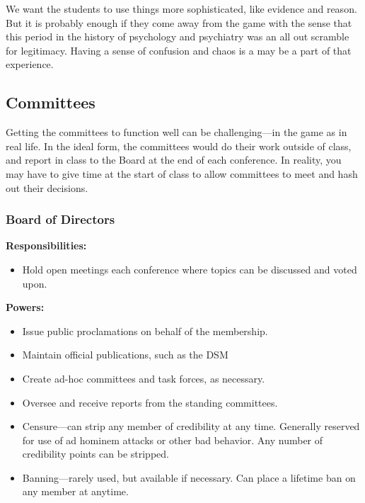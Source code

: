 \begin{refsection}
We want the students to use things more sophisticated, like evidence and reason. But it is probably enough if they come away from the game with the sense that this period in the history of psychology and psychiatry was an all out scramble for legitimacy. Having a sense of confusion and chaos is a may be a part of that experience.

\subsection{Committees}
\label{committees}

Getting the committees to function well can be challenging---in the game as in real life. In the ideal form, the committees would do their work outside of class, and report in class to the Board at the end of each conference. In reality, you may have to give time at the start of class to allow committees to meet and hash out their decisions.

\subsubsection{Board of Directors}
\label{boardofdirectors}

\textbf{Responsibilities:}

\begin{itemize}
\item Hold open meetings each conference where topics can be discussed and voted upon.

\end{itemize}

\textbf{Powers:}

\begin{itemize}
\item Issue public proclamations on behalf of the membership.

\item Maintain official publications, such as the DSM

\item Create ad-hoc committees and task forces, as necessary.

\item Oversee and receive reports from the standing committees.

\item Censure---can strip any member of credibility at any time. Generally reserved for use of ad hominem attacks or other bad behavior. Any number of credibility points can be stripped.

\item Banning---rarely used, but available if necessary. Can place a lifetime ban on any member at anytime.


\end{itemize}
\end{refsection}
